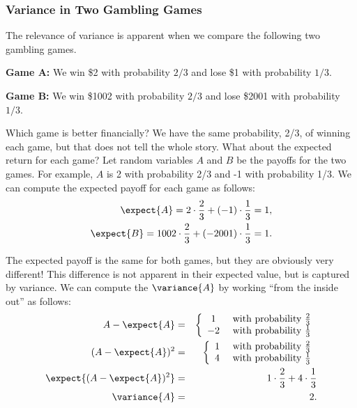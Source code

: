 \subsubsection{Variance in Two Gambling Games}

The relevance of variance is apparent when we compare the following
two gambling games.

\textbf{Game A:} We win \$2 with probability $2/3$ and lose \$1 with probability
$1/3$.

\textbf{Game B:} We win \$1002 with probability $2/3$ and lose \$2001 with
probability $1/3$.

Which game is better financially?  We have the same probability, 2/3,
of winning each game, but that does not tell the whole story.  What about
the expected return for each game?  Let random variables $A$ and $B$ be
the payoffs for the two games.  For example, $A$ is 2 with probability
2/3 and -1 with probability 1/3.  We can compute the
expected payoff for each game as follows:
\begin{eqnarray*}
\expect{A} = 2 \cdot \frac{2}{3} + (-1) \cdot \frac{1}{3} = 1, \\
\expect{B} = 1002 \cdot \frac{2}{3} + (-2001) \cdot \frac{1}{3} = 1.
\end{eqnarray*}

The expected payoff is the same for both games, but they are obviously
very different!  This difference is not apparent in their expected value,
but is captured by variance.  We can compute the $\variance{A}$ by working
``from the inside out'' as follows:
\begin{eqnarray*}
A - \expect{A}
        & = &   \left\{
                \begin{array}{cl}
                        1 & \text{ with probability } \frac{2}{3} \\
                        -2 & \text{ with probability } \frac{1}{3}
                \end{array}
                \right. \\
(A - \expect{A})^2
        & = &   \left\{
                \begin{array}{cl}
                        1 & \text{ with probability } \frac{2}{3} \\
                        4 & \text{ with probability } \frac{1}{3}
                \end{array}
                \right. \\
\expect{(A - \expect{A})^2}
        & = &   1 \cdot \frac{2}{3} + 4 \cdot \frac{1}{3} \\
\variance{A} & = & 2.
\end{eqnarray*}

